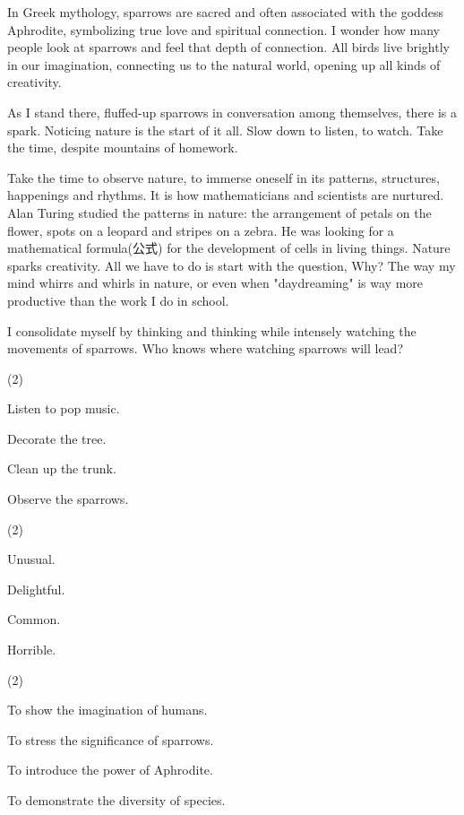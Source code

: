 \documentclass{英语试卷}
\begin{document}
\par In Greek mythology, sparrows are sacred and often associated with the goddess Aphrodite, symbolizing true love and spiritual connection. I wonder how many people look at sparrows and feel that depth of connection. All birds live brightly in our imagination, connecting us to the natural world, opening up all kinds of creativity.\par
\par As I stand there, fluffed-up sparrows in conversation among themselves, there is a spark. Noticing nature is the start of it all. Slow down to listen, to watch. Take the time, despite mountains of homework.\par
\par Take the time to observe nature, to immerse oneself in its patterns, structures, happenings and rhythms. It is how mathematicians and scientists are nurtured. Alan Turing studied the patterns in nature: the arrangement of petals on the flower, spots on a leopard and stripes on a zebra. He was looking for a mathematical formula(公式) for the development of cells in living things. Nature sparks creativity. All we have to do is start with the question, Why? The way my mind whirrs and whirls in nature, or even when "daydreaming" is way more productive than the work I do in school.\par
\par I consolidate myself by thinking and thinking while intensely watching the movements of sparrows. Who knows where watching sparrows will lead?\par
{}
\begin{choices}(2)
  \item Listen to pop music.
  \item Decorate the tree.
  \item Clean up the trunk.
  \item Observe the sparrows.
\end{choices}
\begin{choices}(2)
  \item Unusual.
  \item Delightful.
  \item Common.
  \item Horrible.
\end{choices}
\begin{choices}(2)
  \item To show the imagination of humans.
  \item To stress the significance of sparrows.
  \item To introduce the power of Aphrodite.
  \item To demonstrate the diversity of species.
\end{choices}
\end{document}
